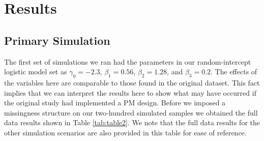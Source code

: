 \documentclass{svjour3}                     %
\begin{document}
\section{Results}
\label{sec:3}
\subsection{Primary Simulation}
\label{sec:3.1}
The first set of simulations we ran had the parameters in our random-intercept logistic model set as $\gamma_0 = -2.3$, $\beta_1 = 0.56$, $\beta_2 = 1.28$, and $\beta_3 = 0.2$. The effects of the variables here are comparable to those found in the original dataset. This fact implies that we can interpret the results here to show what may have occurred if the original study had implemented a PM design. Before we imposed a missingness structure on our two-hundred simulated samples we obtained the full data results shown in Table \ref{tab:table2}. We note that the full data results for the other simulation scenarios are also provided in this table for ease of reference.
\end{document}

